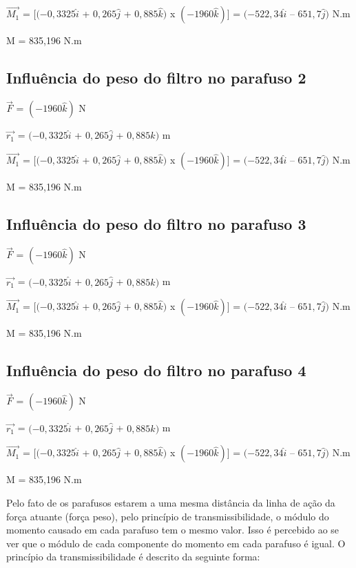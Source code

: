 \documentclass[
	12pt,				%
	oneside,			%
	a4paper,			%
	english,			%
	french,				%
	spanish,			%
	brazil,				%
	]{abntex2}
\begin{document}
$\vec{M_{1}}$ = $[(-0,3325\widehat{i}$ + $0,265\widehat{j}$ + $0,885\widehat{k})$  x  $(-1960\widehat{k})]$ = $(-522,34\widehat{i}$ – $651,7\widehat{j})$ N.m

M  = 835,196 N.m


\subsection{Influência do peso do filtro no parafuso 2}

$\vec{F}$ = $(-1960\widehat{k})$ N

$\vec{r_{1}}$ = $(-0,3325\widehat{i}$ + $0,265\widehat{j}$ + $0,885\widehat{k})$ m

$\vec{M_{1}}$ = $[(-0,3325\widehat{i}$ + $0,265\widehat{j}$ + $0,885\widehat{k})$  x  $(-1960\widehat{k})]$ = $(-522,34\widehat{i}$ – $651,7\widehat{j})$ N.m

M  = 835,196 N.m

\subsection{Influência do peso do filtro no parafuso 3}

$\vec{F}$ = $(-1960\widehat{k})$ N

$\vec{r_{1}}$ = $(-0,3325\widehat{i}$ + $0,265\widehat{j}$ + $0,885\widehat{k})$ m

$\vec{M_{1}}$ = $[(-0,3325\widehat{i}$ + $0,265\widehat{j}$ + $0,885\widehat{k})$  x  $(-1960\widehat{k})]$ = $(-522,34\widehat{i}$ – $651,7\widehat{j})$ N.m

M  = 835,196 N.m

\subsection{Influência do peso do filtro no parafuso 4}

$\vec{F}$ = $(-1960\widehat{k})$ N

$\vec{r_{1}}$ = $(-0,3325\widehat{i}$ + $0,265\widehat{j}$ + $0,885\widehat{k})$ m

$\vec{M_{1}}$ = $[(-0,3325\widehat{i}$ + $0,265\widehat{j}$ + $0,885\widehat{k})$  x  $(-1960\widehat{k})]$ = $(-522,34\widehat{i}$ – $651,7\widehat{j})$ N.m

M  = 835,196 N.m

Pelo fato de os parafusos estarem a uma mesma distância da linha de ação da força atuante (força peso), pelo princípio de transmissibilidade, o módulo do momento causado em cada parafuso tem o mesmo valor. Isso é percebido ao se ver que o módulo de cada componente do momento em cada parafuso é igual. O princípio da transmissibilidade é descrito da seguinte forma:
\end{document}
